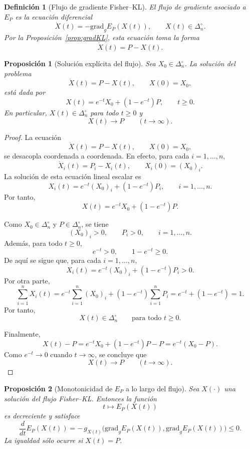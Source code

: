 ﻿\documentclass[12pt]{article}
\newtheorem{definicion}{Definición}[section]
\newtheorem{proposicion}{Proposición}[section]
\begin{document}
\begin{definicion}[Flujo de gradiente Fisher--KL]\label{def:flujoFisherKL}
El \emph{flujo de gradiente} asociado a $E_P$ es la ecuación diferencial
\[
\dot X(t)=-\mathrm{grad}_gE_P(X(t)),
\qquad
X(t)\in\Delta_n^\circ.
\]
Por la Proposición~\ref{prop:gradKL}, esta ecuación toma la forma
\[
\dot X(t)=P-X(t).
\]
\end{definicion}

\begin{proposicion}[Solución explícita del flujo]\label{prop:solucionExplicita}
Sea $X_0\in\Delta_n^\circ$. La solución del problema
\[
\dot X(t)=P-X(t),
\qquad
X(0)=X_0,
\]
está dada por
\[
X(t)=e^{-t}X_0+(1-e^{-t})P,
\qquad t\ge 0.
\]
En particular, $X(t)\in\Delta_n^\circ$ para todo $t\ge 0$ y
\[
X(t)\longrightarrow P
\qquad (t\to\infty).
\]
\end{proposicion}

\begin{proof}
La ecuación
\[
\dot X(t)=P-X(t),\qquad X(0)=X_0,
\]
se desacopla coordenada a coordenada. En efecto, para cada $i=1,\dots,n$,
\[
\dot X_i(t)=P_i-X_i(t),\qquad X_i(0)=(X_0)_i.
\]
La solución de esta ecuación lineal escalar es
\[
X_i(t)=e^{-t}(X_0)_i+(1-e^{-t})P_i,
\qquad i=1,\dots,n.
\]
Por tanto,
\[
X(t)=e^{-t}X_0+(1-e^{-t})P.
\]

Como $X_0\in\Delta_n^\circ$ y $P\in\Delta_n^\circ$, se tiene
\[
(X_0)_i>0,\qquad P_i>0,\qquad i=1,\dots,n.
\]
Además, para todo $t\ge 0$,
\[
e^{-t}>0,
\qquad
1-e^{-t}\ge 0.
\]
De aquí se sigue que, para cada $i=1,\dots,n$,
\[
X_i(t)=e^{-t}(X_0)_i+(1-e^{-t})P_i>0.
\]
Por otra parte,
\[
\sum_{i=1}^n X_i(t)
=
e^{-t}\sum_{i=1}^n (X_0)_i
+
(1-e^{-t})\sum_{i=1}^n P_i
=
e^{-t}+(1-e^{-t})
=
1.
\]
Por tanto,
\[
X(t)\in\Delta_n^\circ
\qquad \text{para todo } t\ge 0.
\]

Finalmente,
\[
X(t)-P
=
e^{-t}X_0+(1-e^{-t})P-P
=
e^{-t}(X_0-P).
\]
Como $e^{-t}\to 0$ cuando $t\to\infty$, se concluye que
\[
X(t)\to P
\qquad (t\to\infty).
\]
\end{proof}

\begin{proposicion}[Monotonicidad de $E_P$ a lo largo del flujo]\label{prop:Hteorema}
Sea $X(\cdot)$ una solución del flujo Fisher--KL. Entonces la función
\[
t\longmapsto E_P(X(t))
\]
es decreciente y satisface
\[
\frac{d}{dt}E_P(X(t))
=
-\,g_{X(t)}\!\bigl(\mathrm{grad}_gE_P(X(t)),\mathrm{grad}_gE_P(X(t))\bigr)
\le 0.
\]
La igualdad sólo ocurre si $X(t)=P$.
\end{proposicion}
\end{document}

